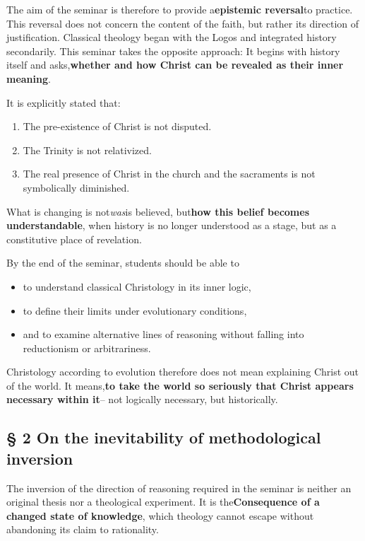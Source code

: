 \documentclass[
]{article}
\begin{document}
The aim of the seminar is therefore to provide a\textbf{epistemic reversal}to practice. This reversal does not concern the content of the faith, but rather its direction of justification. Classical theology began with the Logos and integrated history secondarily. This seminar takes the opposite approach: It begins with history itself and asks,\textbf{whether and how Christ can be revealed as their inner meaning}.

It is explicitly stated that:

\begin{enumerate}
\def\labelenumi{\arabic{enumi}.}
\setcounter{enumi}{3}
\item
  The pre-existence of Christ is not disputed.
\item
  The Trinity is not relativized.
\item
  The real presence of Christ in the church and the sacraments is not symbolically diminished.
\end{enumerate}

What is changing is not\emph{was}is believed, but\textbf{how this belief becomes understandable}, when history is no longer understood as a stage, but as a constitutive place of revelation.

By the end of the seminar, students should be able to

\begin{itemize}
\item
  to understand classical Christology in its inner logic,
\item
  to define their limits under evolutionary conditions,
\item
  and to examine alternative lines of reasoning without falling into reductionism or arbitrariness.
\end{itemize}

Christology according to evolution therefore does not mean explaining Christ out of the world. It means,\textbf{to take the world so seriously that Christ appears necessary within it}-- not logically necessary, but historically.

\subsection{\texorpdfstring{\textbf{§ 2 On the inevitability of methodological inversion}}{§ 2 On the inevitability of methodological inversion}}\label{on-the-inevitability-of-methodological-inversion}

The inversion of the direction of reasoning required in the seminar is neither an original thesis nor a theological experiment. It is the\textbf{Consequence of a changed state of knowledge}, which theology cannot escape without abandoning its claim to rationality.
\end{document}
